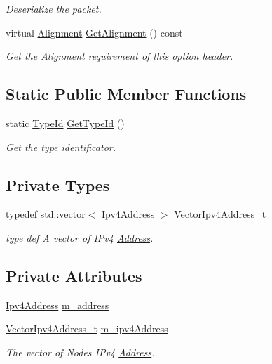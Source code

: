 \begin{DoxyCompactItemize}
\begin{DoxyCompactList}\small\item\em Deserialize the packet. \end{DoxyCompactList}\item 
virtual \hyperlink{structns3_1_1dsr_1_1DsrOptionHeader_1_1Alignment}{Alignment} \hyperlink{classns3_1_1dsr_1_1DsrOptionRrepHeader_a5c9e15e875b0746c686edba4c6136fb0}{Get\+Alignment} () const 
\begin{DoxyCompactList}\small\item\em Get the Alignment requirement of this option header. \end{DoxyCompactList}\end{DoxyCompactItemize}
\subsection*{Static Public Member Functions}
\begin{DoxyCompactItemize}
\item 
static \hyperlink{classns3_1_1TypeId}{Type\+Id} \hyperlink{classns3_1_1dsr_1_1DsrOptionRrepHeader_a6c4f0eca5676232447c9a788f731047b}{Get\+Type\+Id} ()
\begin{DoxyCompactList}\small\item\em Get the type identificator. \end{DoxyCompactList}\end{DoxyCompactItemize}
\subsection*{Private Types}
\begin{DoxyCompactItemize}
\item 
typedef std\+::vector$<$ \hyperlink{classns3_1_1Ipv4Address}{Ipv4\+Address} $>$ \hyperlink{classns3_1_1dsr_1_1DsrOptionRrepHeader_a56b394e282c8c29928ddf712f97d8670}{Vector\+Ipv4\+Address\+\_\+t}
\begin{DoxyCompactList}\small\item\em type def A vector of I\+Pv4 \hyperlink{classns3_1_1Address}{Address}. \end{DoxyCompactList}\end{DoxyCompactItemize}
\subsection*{Private Attributes}
\begin{DoxyCompactItemize}
\item 
\hyperlink{classns3_1_1Ipv4Address}{Ipv4\+Address} \hyperlink{classns3_1_1dsr_1_1DsrOptionRrepHeader_a2396bcb9c2f0f32237edcef891b87cca}{m\+\_\+address}
\item 
\hyperlink{classns3_1_1dsr_1_1DsrOptionRrepHeader_a56b394e282c8c29928ddf712f97d8670}{Vector\+Ipv4\+Address\+\_\+t} \hyperlink{classns3_1_1dsr_1_1DsrOptionRrepHeader_a42818ebd088a2edcdda07b8ed43e4708}{m\+\_\+ipv4\+Address}
\begin{DoxyCompactList}\small\item\em The vector of Nodes\textquotesingle{} I\+Pv4 \hyperlink{classns3_1_1Address}{Address}. \end{DoxyCompactList}\end{DoxyCompactItemize}
